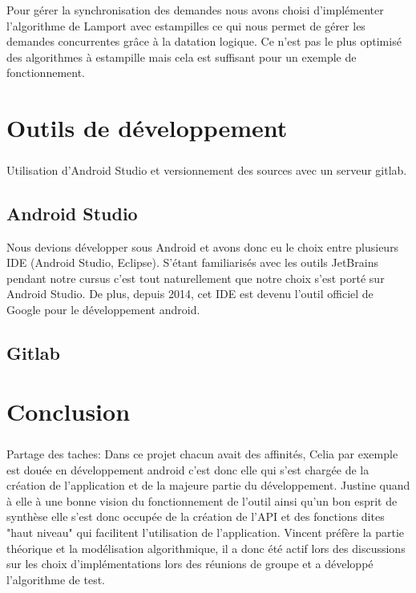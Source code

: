 \documentclass[a4paper,10pt]{report}
\begin{document}
Pour gérer la synchronisation des demandes nous avons choisi d'implémenter l'algorithme de Lamport avec estampilles ce qui nous permet de gérer les demandes concurrentes grâce à la datation logique. Ce n'est pas le plus optimisé des algorithmes à estampille mais cela est suffisant pour un exemple de fonctionnement.

\chapter{Outils de développement}
  \paragraph{}
  Utilisation d'Android Studio et versionnement des sources avec un serveur gitlab.
  \section{Android Studio}
  Nous devions développer sous Android et avons donc eu le choix entre plusieurs IDE (Android Studio, Eclipse). S'étant familiarisés avec les outils JetBrains pendant notre cursus c'est tout naturellement que notre choix s'est porté sur Android Studio. De plus, depuis 2014, cet IDE est devenu l'outil officiel de Google pour le développement android.
  \section{Gitlab}
\chapter{Conclusion}
\paragraph{}
Partage des taches:
Dans ce projet chacun avait des affinités, Celia par exemple est douée en développement android c'est donc elle qui s'est chargée de la création de l'application et de la majeure partie du développement. Justine quand à elle à une bonne vision du fonctionnement de l'outil ainsi qu'un bon esprit de synthèse elle s'est donc occupée de la création de l'API et des fonctions dites "haut niveau" qui facilitent l'utilisation de l'application. Vincent préfère la partie théorique et la modélisation algorithmique, il a donc été actif lors des discussions sur les choix d'implémentations lors des réunions de groupe et a développé l'algorithme de test.
\end{document}
